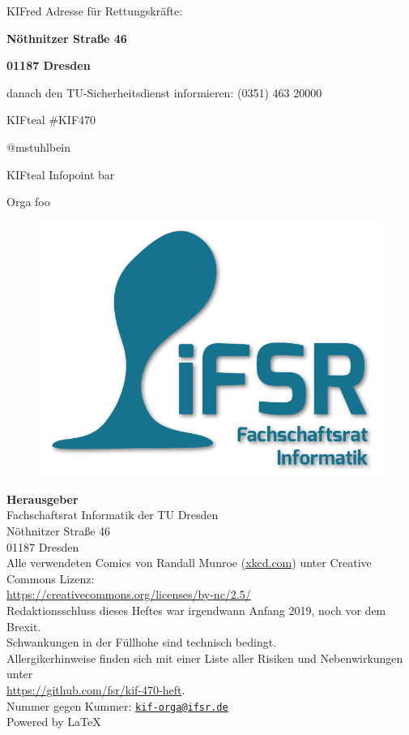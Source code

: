 \begin{awesomeblock}[KIFred]{2pt}{\faFire}{KIFred}
    Adresse für Rettungskräfte:

    \begin{center}
      \textbf{Nöthnitzer Straße 46}

      \textbf{01187 Dresden}
    \end{center}

   danach den TU-Sicherheitsdienst informieren:
   (0351) 463 20000
\end{awesomeblock}

\begin{awesomeblock}[KIFteal]{2pt}{\faTwitter}{KIFteal}
  \#KIF470

  @mstuhlbein
\end{awesomeblock}

\begin{awesomeblock}[KIFteal]{2pt}{\faInfoCircle}{KIFteal}
  Infopoint bar

  Orga foo
\end{awesomeblock}

\vfill

\setlength{\parindent}{0cm}

\begin{figure}
  \vspace*{-20pt}
  \includegraphics[width=.4\textwidth]{img/imprint}
\end{figure}

\footnotesize
\textbf{Herausgeber} \\
Fachschaftsrat Informatik der TU Dresden\\
Nöthnitzer Straße 46\\
01187 Dresden\\[1\baselineskip]

Alle verwendeten Comics von Randall Munroe (\url{xkcd.com}) unter Creative Commons Lizenz:\\
\url{https://creativecommons.org/licenses/by-nc/2.5/}\\[1\baselineskip]

Redaktionsschluss dieses Heftes war irgendwann Anfang 2019, noch vor dem Brexit.\\%
Schwankungen in der Füllhohe sind technisch bedingt.\\[1\baselineskip]

Allergikerhinweise finden sich mit einer Liste aller Risiken und Nebenwirkungen unter\\
\url{https://github.com/fsr/kif-470-heft}.\\[1\baselineskip]

Nummer gegen Kummer: \href{mailto:kif-orga@ifsr.de}{\texttt{kif-orga@ifsr.de}}\\[1\baselineskip]

Powered by \LaTeX%
